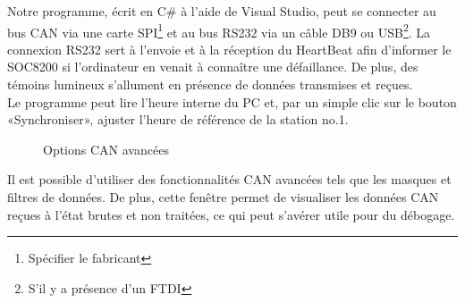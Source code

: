\documentclass[10pt,a4paper,final]{article}
\begin{document}
\begin{spacing}{1.5}
Notre programme, écrit en C\# à l'aide de Visual Studio, peut se connecter au bus CAN via une carte SPI\footnote{Spécifier le fabricant} et au bus RS232 via un câble DB9 ou USB\footnote{S'il y a présence d'un FTDI}. La connexion RS232 sert à l'envoie et à la réception du HeartBeat afin d'informer le SOC8200 si l'ordinateur en venait à connaître une défaillance. De plus, des témoins lumineux s'allument en présence de données transmises et reçues. \\
Le programme peut lire l'heure interne du PC et, par un simple clic sur le bouton «Synchroniser», ajuster l'heure de référence de la station no.1.\\
\vfill
\pagebreak





\begin{figure}[hbtp]
\caption{Options CAN avancées}
\centering
{}
\end{figure}
Il est possible d'utiliser des fonctionnalités CAN avancées tels que les masques et filtres de données. De plus, cette fenêtre permet de visualiser les données CAN reçues à l'état brutes et non traitées, ce qui peut s'avérer utile pour du débogage.
\pagebreak


\end{spacing}
\end{document}
